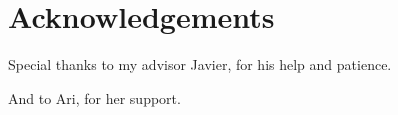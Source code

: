 \chapter*{Acknowledgements}

\noindent
Special thanks to my advisor Javier, for his help and patience.

\noindent
And to Ari, for her support.